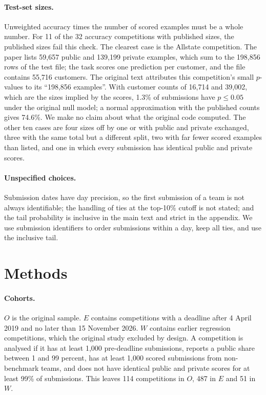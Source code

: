 \documentclass[10pt]{article}
\begin{document}
\paragraph{Test-set sizes.} Unweighted accuracy times the number of scored examples must be a whole number. For 11 of the 32 accuracy competitions with published sizes, the published sizes fail this check. The clearest case is the Allstate competition. The paper lists 59,657 public and 139,199 private examples, which sum to the 198,856 rows of the test file; the task scores one prediction per customer, and the file contains 55,716 customers. The original text attributes this competition's small $p$-values to its ``198,856 examples''. With customer counts of 16,714 and 39,002, which are the sizes implied by the scores, 1.3\% of submissions have $p \le 0.05$ under the original null model; a normal approximation with the published counts gives 74.6\%. We make no claim about what the original code computed. The other ten cases are four sizes off by one or with public and private exchanged, three with the same total but a different split, two with far fewer scored examples than listed, and one in which every submission has identical public and private scores.

\paragraph{Unspecified choices.} Submission dates have day precision, so the first submission of a team is not always identifiable; the handling of ties at the top-10\% cutoff is not stated; and the tail probability is inclusive in the main text and strict in the appendix. We use submission identifiers to order submissions within a day, keep all ties, and use the inclusive tail.

\section{Methods}
\label{sec:methods}

\paragraph{Cohorts.} $O$ is the original sample. $E$ contains competitions with a deadline after 4 April 2019 and no later than 15 November 2026. $W$ contains earlier regression competitions, which the original study excluded by design. A competition is analysed if it has at least 1,000 pre-deadline submissions, reports a public share between 1 and 99 percent, has at least 1,000 scored submissions from non-benchmark teams, and does not have identical public and private scores for at least 99\% of submissions. This leaves 114 competitions in $O$, 487 in $E$ and 51 in $W$.
\end{document}
